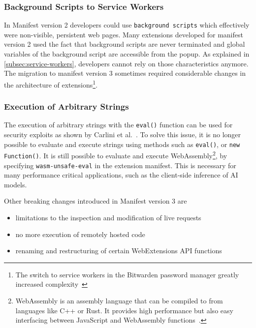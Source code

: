 \subsubsection{Background Scripts to Service Workers}
In Manifest version 2 developers could use \verb|background scripts| which effectively were non-visible, persistent web pages.
Many extensions developed for manifest version 2 used the fact that background scripts are never terminated and global variables of the background script are accessible from the popup.
As explained in \cref{subsec:service-workers}, developers cannot rely on those characteristics anymore.
The migration to manifest version 3 sometimes required considerable changes in the architecture of extensions\footnote{
The switch to service workers in the Bitwarden password manager greatly increased complexity~\cite{gonzalez2024bitwarden}}.

\subsubsection{Execution of Arbitrary Strings}
The execution of arbitrary strings with the \verb|eval()| function can be used for security exploits as shown by Carlini et al.~\cite{carlini2012evaluation}.
To solve this issue, it is no longer possible to evaluate and execute strings using methods such as \verb|eval()|, or \verb|new Function()|.
It is still possible to evaluate and execute WebAssembly\footnote{WebAssembly is an assembly language that can be compiled to from languages like C++ or Rust. It provides high performance but also easy interfacing between JavaScript and WebAssembly functions~\cite{a2024webassembly}.}, by specifying \verb|wasm-unsafe-eval| in the extension manifest.
This is necessary for many performance critical applications, such as the client-side inference of AI models.

Other breaking changes introduced in Manifest version 3 are 
\begin{itemize}
    \item limitations to the inspection and modification of live requests
    \item no more execution of remotely hosted code
    \item renaming and restructuring of certain WebExtensions API functions
\end{itemize}



